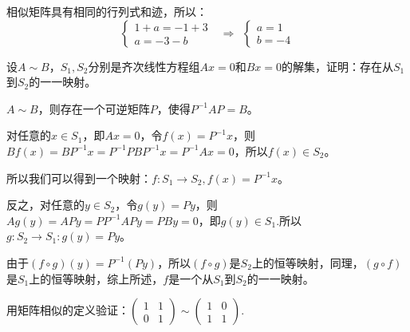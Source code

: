 \documentclass[a4paper]{report}
\begin{document}
\begin{jie}
相似矩阵具有相同的行列式和迹，所以：
\begin{equation*}
\begin{cases}
1+a=-1+3\\
a=-3-b
\end{cases}~~~\Rightarrow~~
\begin{cases}
a=1\\ b=-4
\end{cases}
\end{equation*}
\end{jie}

\EX 设$A\sim B$，$S_1,S_2$分别是齐次线性方程组$Ax=0$和$Bx=0$的解集，证明：存在从$S_1$到$S_2$的一一映射。

\begin{zhengming}
$A\sim B$，则存在一个可逆矩阵$P$，使得$P^{-1}AP=B$。

对任意的$x\in S_1$，即$Ax=0$，令$f(x)=P^{-1}x$，则$Bf(x)=BP^{-1}x=P^{-1}PBP^{-1}x=P^{-1}Ax=0$，所以$f(x)\in S_2$。

所以我们可以得到一个映射：$f:S_1\rightarrow S_2,f(x)=P^{-1}x$。

反之，对任意的$y\in S_2$，令$g(y)=Py$，则$Ag(y)=APy=PP^{-1}APy=PBy=0$，即$g(y)\in S_1$.所以$g:S_2\rightarrow S_1:g(y)=Py$。

由于$(f\circ g)(y)=P^{-1}(Py)$，所以$(f\circ g)$是$S_2$上的恒等映射，同理，$(g\circ f)$是$S_1$上的恒等映射，综上所述，$f$是一个从$S_1$到$S_2$的一一映射。
\end{zhengming}

\EX 用矩阵相似的定义验证：$
\begin{pmatrix}
1&1\\0&1
\end{pmatrix}\sim
\begin{pmatrix}
1&0\\1&1
\end{pmatrix}
$.
\end{document}
